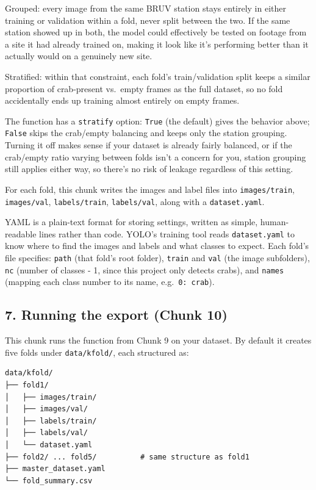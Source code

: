 \documentclass[
]{book}
\begin{document}
Grouped: every image from the same BRUV station stays entirely in either training or validation within a fold, never split between the two. If the same station showed up in both, the model could effectively be tested on footage from a site it had already trained on, making it look like it's performing better than it actually would on a genuinely new site.

Stratified: within that constraint, each fold's train/validation split keeps a similar proportion of crab-present vs.~empty frames as the full dataset, so no fold accidentally ends up training almost entirely on empty frames.

The function has a \texttt{stratify} option: \texttt{True} (the default) gives the behavior above; \texttt{False} skips the crab/empty balancing and keeps only the station grouping. Turning it off makes sense if your dataset is already fairly balanced, or if the crab/empty ratio varying between folds isn't a concern for you, station grouping still applies either way, so there's no risk of leakage regardless of this setting.

For each fold, this chunk writes the images and label files into \texttt{images/train}, \texttt{images/val}, \texttt{labels/train}, \texttt{labels/val}, along with a \texttt{dataset.yaml}.

YAML is a plain-text format for storing settings, written as simple, human-readable lines rather than code. YOLO's training tool reads \texttt{dataset.yaml} to know where to find the images and labels and what classes to expect. Each fold's file specifies: \texttt{path} (that fold's root folder), \texttt{train} and \texttt{val} (the image subfolders), \texttt{nc} (number of classes - 1, since this project only detects crabs), and \texttt{names} (mapping each class number to its name, e.g.~\texttt{0:\ crab}).

\subsection*{7. Running the export (Chunk 10)}\label{running-the-export-chunk-10}

This chunk runs the function from Chunk 9 on your dataset. By default it creates five folds under \texttt{data/kfold/}, each structured as:

\begin{verbatim}
data/kfold/
├── fold1/
│   ├── images/train/
│   ├── images/val/
│   ├── labels/train/
│   ├── labels/val/
│   └── dataset.yaml
├── fold2/ ... fold5/          # same structure as fold1
├── master_dataset.yaml
└── fold_summary.csv
\end{verbatim}
\end{document}
